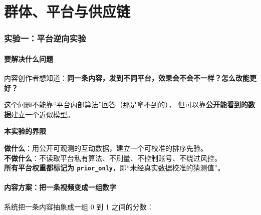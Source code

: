 \documentclass[UTF8,a4paper,11pt]{ctexart}
\newenvironment{explainbox}[1]
{\begin{center}\begin{minipage}{0.94\textwidth}\colorbox{boxbg}{\parbox{0.92\textwidth}{\textbf{#1}\par\vspace{2pt}}}}
{\end{minipage}\end{center}}
\newcommand{\sym}[1]{\texttt{#1}}
\newcommand{\hl}[1]{\textcolor{blue!70!black}{\textbf{#1}}}
\begin{document}
\newpage


\part{群体、平台与供应链}

\section{实验一：平台逆向实验}

\subsection{要解决什么问题}

内容创作者想知道：\hl{同一条内容，发到不同平台，效果会不会不一样？怎么改能更好？}

这个问题不能靠“平台内部算法”回答（那是拿不到的），
但可以靠\textbf{公开能看到的数据}建立一个近似模型。

\begin{explainbox}{本实验的界限}
\textbf{做什么}：用公开可观测的互动数据，建立一个可校准的排序先验。\\
\textbf{不做什么}：不读取平台私有算法、不刷量、不控制账号、不绕过风控。\\
\textbf{所有平台权重都标记为 \sym{prior\_only}}，即“未经真实数据校准的猜测值”。
\end{explainbox}

\subsection{内容方案：把一条视频变成一组数字}

系统把一条内容抽象成一组 0 到 1 之间的分数：
\end{document}

